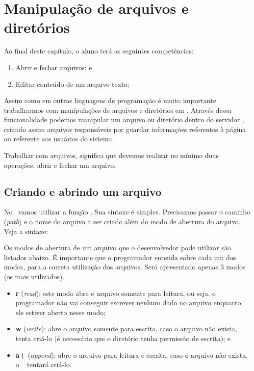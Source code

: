 \chapter{Manipulação de arquivos e diretórios}
\label{manipulacao-de-arquivos-e-diretorios}

Ao final deste capítulo, o aluno terá as seguintes competências:
\begin{enumerate}
    \item Abrir e fechar arquivos; e
    \item Editar conteúdo de um arquivo texto;
\end{enumerate}

Assim como em outras linguagens de programação é muito importante trabalharmos 
com manipulações de arquivos e diretórios em \php. Através dessa funcionalidade 
podemos manipular um arquivo ou diretório dentro do servidor \web, criando assim
arquivos responsáveis por guardar informações referentes à página ou referente
aos usuários do sistema. 

Trabalhar com arquivos, significa que devemos realizar no mínimo duas operações: 
abrir e fechar um arquivo.

\section{Criando e abrindo um arquivo}
\label{criando-e-abrindo-um-arquivo}

No \php~vamos utilizar a função \funcaofopen. Sua sintaxe é simples. Precisamos
passar o caminho (\textit{path}) e o nome do arquivo a ser criado além do modo de
abertura do arquivo. Veja a sintaxe:



Os modos de abertura de um arquivo que o desenvolvedor pode utilizar são listados
abaixo. É importante que o programador entenda sobre cada um dos modos, para a 
correta utilização dos arquivos. Será apresentado apenas 3 modos (os mais utilizados).

\begin{itemize}
  \item \textbf{r} (\textit{read}): este modo abre o arquivo somente para leitura,
  ou seja, o programador não vai conseguir escrever nenhum dado no arquivo enquanto
  ele estiver aberto nesse modo;
  \item \textbf{w} (\textit{write}): abre o arquivo somente para escrita, caso o 
  arquivo não exista, tenta criá-lo (é necessário que o diretório tenha permissão
  de escrita); e
  \item \textbf{a+} (\textit{append}): abre o arquivo para leitura e escrita, 
  caso o arquivo não exista, o \php~ tentará criá-lo.  
\end{itemize}

